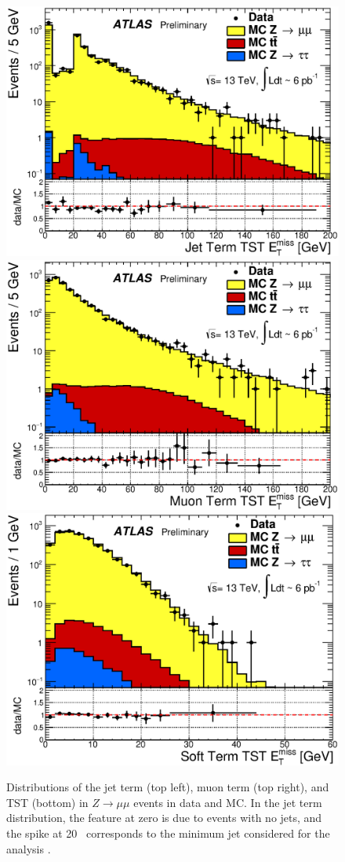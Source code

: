 \begin{centering}
\begin{figure}[!hbt]
\myfloatalign
\includegraphics[width=.70\linewidth]{figures/reco/met_fig_02a.eps}
\includegraphics[width=.70\linewidth]{figures/reco/met_fig_02b.eps} \\
\includegraphics[width=.70\linewidth]{figures/reco/met_fig_02c.eps}
\caption{ Distributions of the jet term (top left), muon term (top right), and \ac{TST} (bottom) \met in $Z\rightarrow\mu\mu$ events in data and \ac{MC}. In the jet term distribution, the feature at zero is due to events with no jets, and the spike at 20 \gev~corresponds to the minimum jet \pt considered for the analysis \cite{ATL-PHYS-PUB-2015-027}. }
\label{fig:reco_met_terms}
\end{figure}
\end{centering}




